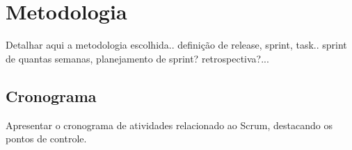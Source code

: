 \section{Metodologia}
	Detalhar aqui a metodologia escolhida.. definição de release, sprint, task.. sprint de quantas semanas, planejamento de sprint? retrospectiva?...

	\subsection{Cronograma} %
	\label{sub:cronograma}
		Apresentar o cronograma de atividades relacionado ao Scrum, destacando os pontos de controle.
